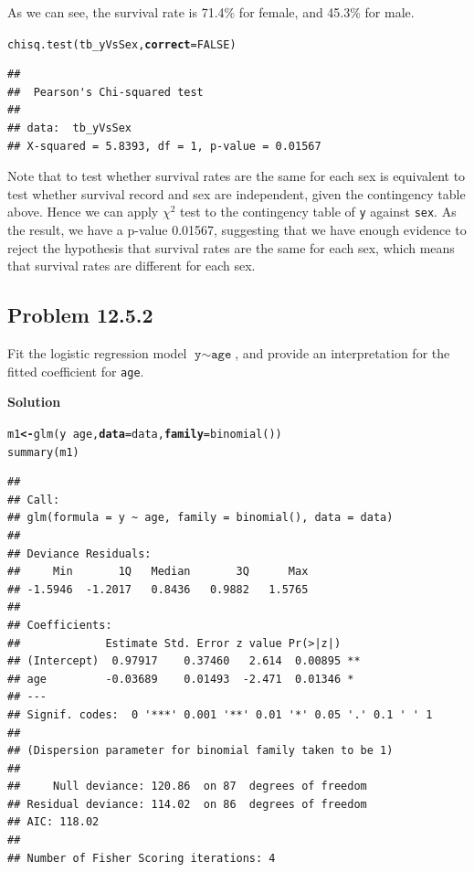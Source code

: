 \documentclass[12pt,oneside,a4paper]{article}\usepackage[]{graphicx}\usepackage[]{xcolor}
\makeatletter
\newcommand{\hlnum}[1]{\textcolor[rgb]{0,0,0}{#1}}%
\newcommand{\hlopt}[1]{\textcolor[rgb]{0,0,0}{#1}}%
\newcommand{\hlstd}[1]{\textcolor[rgb]{0,0,0}{#1}}%
\newcommand{\hlkwb}[1]{\textcolor[rgb]{0.498,0,0.333}{\textbf{#1}}}%
\newcommand{\hlkwc}[1]{\textcolor[rgb]{0.498,0,0.333}{\textbf{#1}}}%
\newcommand{\hlkwd}[1]{\textcolor[rgb]{0,0,0}{#1}}%
\newenvironment{kframe}{%
 \def\at@end@of@kframe{}%
 \ifinner\ifhmode%
  \def\at@end@of@kframe{\end{minipage}}%
  \begin{minipage}{\columnwidth}%
 \fi\fi%
 \def\FrameCommand##1{\hskip\@totalleftmargin \hskip-\fboxsep
 \colorbox{shadecolor}{##1}\hskip-\fboxsep
     \hskip-\linewidth \hskip-\@totalleftmargin \hskip\columnwidth}%
 \MakeFramed {\advance\hsize-\width
   \@totalleftmargin\z@ \linewidth\hsize
   \@setminipage}}%
 {\par\unskip\endMakeFramed%
 \at@end@of@kframe}
\newenvironment{knitrout}{}{} %
\newcommand{\subproblem}[1]
{
    \subsection*{Problem {#1}}
}
\newcommand{\solution}
{
    \vspace{15pt}
    \noindent\ignorespaces\textbf{\large Solution}\par
}
\newcommand{\m}[1]{\texttt{{#1}}}
\makeatother
\begin{document}
As we can see, the survival rate is 71.4\% for female, and 45.3\% for male.

\begin{knitrout}
\color{fgcolor}\begin{kframe}
\begin{alltt}
\hlkwd{chisq.test}\hlstd{(tb_yVsSex,} \hlkwc{correct} \hlstd{=} \hlnum{FALSE}\hlstd{)}
\end{alltt}
\begin{verbatim}
## 
## 	Pearson's Chi-squared test
## 
## data:  tb_yVsSex
## X-squared = 5.8393, df = 1, p-value = 0.01567
\end{verbatim}
\end{kframe}
\end{knitrout}

Note that to test whether survival rates are the same for each sex is equivalent to test whether survival record and sex are independent, given the contingency table above. Hence we can apply $\chi^{2}$ test to the contingency table of \m{y} against \m{sex}. As the result, we have a p-value 0.01567, suggesting that we have enough evidence to reject the hypothesis that survival rates are the same for each sex, which means that survival rates are different for each sex.

\subproblem{12.5.2}
Fit the logistic regression model $\m{y} \sim \m{age}$, and provide an interpretation for the fitted coefficient for \m{age}.

\solution
\begin{knitrout}
\color{fgcolor}\begin{kframe}
\begin{alltt}
\hlstd{m1} \hlkwb{<-} \hlkwd{glm}\hlstd{(y} \hlopt{~} \hlstd{age,} \hlkwc{data} \hlstd{= data,} \hlkwc{family} \hlstd{=} \hlkwd{binomial}\hlstd{())}
\hlkwd{summary}\hlstd{(m1)}
\end{alltt}
\begin{verbatim}
## 
## Call:
## glm(formula = y ~ age, family = binomial(), data = data)
## 
## Deviance Residuals: 
##     Min       1Q   Median       3Q      Max  
## -1.5946  -1.2017   0.8436   0.9882   1.5765  
## 
## Coefficients:
##             Estimate Std. Error z value Pr(>|z|)   
## (Intercept)  0.97917    0.37460   2.614  0.00895 **
## age         -0.03689    0.01493  -2.471  0.01346 * 
## ---
## Signif. codes:  0 '***' 0.001 '**' 0.01 '*' 0.05 '.' 0.1 ' ' 1
## 
## (Dispersion parameter for binomial family taken to be 1)
## 
##     Null deviance: 120.86  on 87  degrees of freedom
## Residual deviance: 114.02  on 86  degrees of freedom
## AIC: 118.02
## 
## Number of Fisher Scoring iterations: 4
\end{verbatim}
\end{kframe}
\end{knitrout}
\end{document}
